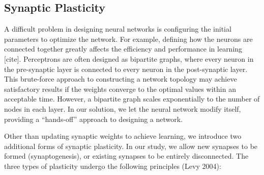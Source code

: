 \documentclass[journal]{./sty/IEEEtran}
\begin{document}
\subsection{Synaptic Plasticity}
A difficult problem in designing neural networks is configuring the initial parameters to optimize the network.
For example, defining how the neurons are connected together greatly affects the efficiency and performance in learning [cite]. 
Perceptrons are often designed as bipartite graphs, where every neuron in the pre-synaptic layer is connected to every neuron in the post-synaptic layer.
This brute-force approach to constructing a network topology may achieve satisfactory results if the weights converge to the optimal values within an acceptable time.
However, a bipartite graph scales exponentially to the number of nodes in each layer. 
In our solution, we let the neural network modify itself, providing a ``hands-off'' approach to designing a network.

Other than updating synaptic weights to achieve learning, we introduce two additional forms of synaptic plasticity. 
In our study, we allow new synapses to be formed (synaptogenesis), or existing synapses to be entirely disconnected. 
The three types of plasticity undergo the following principles (Levy 2004):
\end{document}
